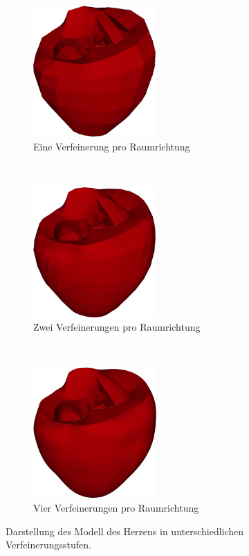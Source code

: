 \documentclass[
	a4paper,			%
	11pt,				%
	headsepline,		%
	bibtotoc,			%
	BCOR18mm,      		%
	DIV14,				%
	headings=normal,
	numbers=noenddot,
]{scrbook}
\theoremstyle{mythmstyle}
\theoremstyle{other}
\begin{document}
	\begin{figure}[h!]
	
	\begin{subfigure}[t]{0.3\textwidth}
		\centering
		\includegraphics[height=5cm]{heart111.png}
		\caption{Eine Verfeinerung pro Raumrichtung}
	\end{subfigure}
	~
	\begin{subfigure}[t]{0.3\textwidth}
		\centering
		\includegraphics[height=5cm]{heart222.png}
		\caption{Zwei Verfeinerungen pro Raumrichtung}
	\end{subfigure}
	~
		\begin{subfigure}[t]{0.3\textwidth}
		\centering
		\includegraphics[height=5cm]{heart444.png}
		\caption{Vier Verfeinerungen pro Raumrichtung}
	\end{subfigure}
	
	\caption{Darstellung des Modell des Herzens in unterschiedlichen Verfeinerungsstufen.  }
		
	\label{figure:refinement}
	\end{figure}
\end{document}
